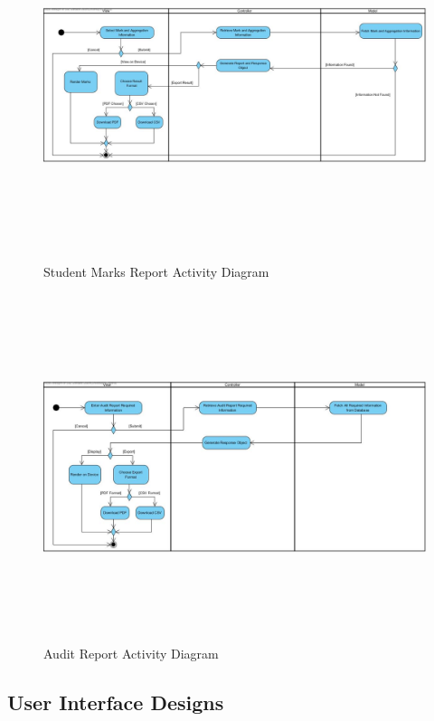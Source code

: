 \documentclass[12pt]{article}
\begin{document}
						\begin{figure}[h]
										\centering
										\includegraphics[width=6in, height=4in]{Pictures/StudentMarksReport.jpg}
										\caption{Student Marks Report Activity Diagram}
						\end{figure}
						\FloatBarrier
						\begin{figure}[h]
										\centering
										\includegraphics[width=6in, height=4in]{Pictures/AuditReportActivityDiagram.jpg}
										\caption{Audit Report Activity Diagram}
						\end{figure}
				\vspace{0.2in}
		
		\subsection{User Interface Designs} %
				\vspace{0.2in}
		
\end{document}
